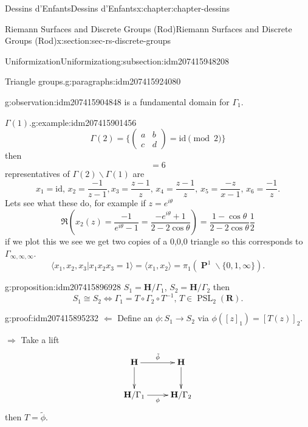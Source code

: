 \documentclass[oneside,10pt,]{book}
\numberwithin{equation}{section}
\newcommand{\inv}{^{-1}}
\newcommand{\lb}{[}
\newcommand{\rb}{]}
\newcommand{\RR}{\mathbf{R}}
\newcommand{\HH}{\mathbf{H}}
\newcommand{\id}{\mathrm{id}}
\DeclareMathOperator{\PP}{\mathbf{P}}
\DeclareMathOperator{\PSL}{PSL}
\newcommand{\amp}{&}
\begin{document}
\begin{chapterptx}{Dessins d'Enfants}{}{Dessins d'Enfants}{}{}{x:chapter:chapter-dessins}
\begin{sectionptx}{Riemann Surfaces and Discrete Groups (Rod)}{}{Riemann Surfaces and Discrete Groups (Rod)}{}{}{x:section:sec-rs-discrete-groups}
\begin{subsectionptx}{Uniformization}{}{Uniformization}{}{}{g:subsection:idm207415948208}
\begin{paragraphs}{Triangle groups.}{g:paragraphs:idm207415924080}
\begin{observation}{}{g:observation:idm207415904848}
is a fundamental domain for \(\Gamma_1\).%
\end{observation}
\begin{example}{\(\Gamma(1)\).}{g:example:idm207415901456}%
%
\begin{equation*}
\Gamma(2) = \{\begin{pmatrix} a\amp b \\ c\amp d\end{pmatrix} = \id \pmod 2 \}
\end{equation*}
then%
\begin{equation*}
[\Gamma(1) : \Gamma(2)] = 6
\end{equation*}
representatives of \(\Gamma(2) \backslash \Gamma(1)\) are%
\begin{equation*}
x_1 = \id,\,x_2 = \frac{-1}{z-1}, x_3 = \frac{z-1}{z},\, x_4 = \frac{z-1}{z},\,x_5 = \frac{-z}{x-1},\,x_6 = \frac{-1}{z}\text{.}
\end{equation*}
Lets see what these do, for example if \(z= e^{i\theta}\)%
\begin{equation*}
\Re(x_2(z) = \frac{-1}{e^{i\theta} - 1} = \frac{-e^{i\theta} + 1}{2- 2\cos \theta}) = \frac{1-\cos \theta}{ 2- 2\cos \theta} \frac 12
\end{equation*}
if we plot this we see we get two copies of a 0,0,0 triangle so this corresponds to \(\Gamma_{\infty,\infty,\infty}\).%
\begin{equation*}
\langle x_1, x_2, x_3 | x_1x_2x_3 = 1\rangle = \langle x_1,x_2\rangle = \pi_1(\PP^1\smallsetminus\{0,1,\infty\})\text{.}
\end{equation*}
%
\end{example}
\begin{proposition}{}{}{g:proposition:idm207415896928}%
\(S_1 = \HH/ \Gamma_1\), \(S_2 = \HH/\Gamma_2\) then%
\begin{equation*}
S_1 \cong S_2 \iff \Gamma_1 = T\circ \Gamma_2 \circ T\inv,\,T\in \PSL_2(\RR)\text{.}
\end{equation*}
%
\end{proposition}
\begin{proofptx}{}{g:proof:idm207415895232}
\(\Leftarrow\) Define an \(\phi\colon S_1 \to S_2\) via \(\phi(\lb z\rb_1) = \lb T(z)\rb_2\).%
\par
\(\Rightarrow\) Take a lift%
\begin{equation*}
\xymatrix{
\HH\ar[r]^{\tilde\phi}\ar[d] & \HH\ar[d] \\
\HH/\Gamma_1\ar[r]_\phi & \HH/\Gamma_2
}
\end{equation*}
then \(T= \tilde \phi\).%

\end{proofptx}
\end{paragraphs}
\end{subsectionptx}
\end{sectionptx}
\end{chapterptx}
\end{document}
